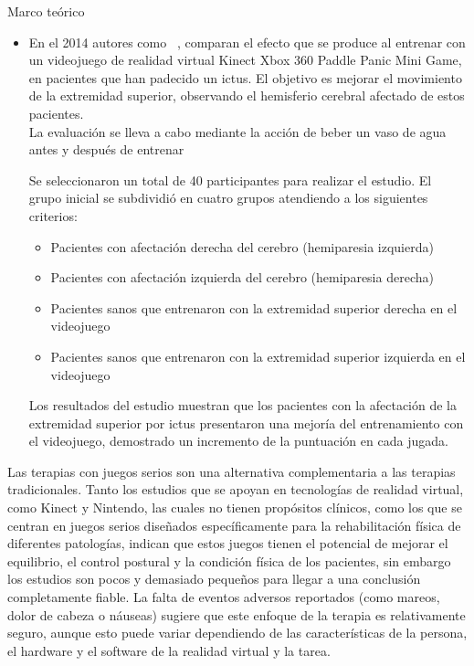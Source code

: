 \begin{thesischapter}{1} {Marco teórico}
\begin{itemize}
        \vspace{2pt}
        Un grupo de 35 pacientes se formó para la rehabilitación de las extremidades superiores
        en combinación con el soporte de brazo y el ejercicio, mientras que 33 pacientes realizaron
        la rehabilitación con los ejercicios convencionales.
        
        \item En el 2014  autores como ~\cite{10.3233/NRE-141105}, comparan el efecto
        que se produce al entrenar con un videojuego de realidad virtual Kinect Xbox 360 Paddle
        Panic Mini Game, en pacientes que han padecido un ictus. El objetivo es mejorar el
        movimiento de la extremidad superior, observando el hemisferio cerebral afectado de
        estos pacientes.\\
        La evaluación se lleva a cabo mediante la acción de beber un vaso de agua antes y después
        de entrenar

        \vspace{5pt}
        Se seleccionaron un total de 40 participantes para realizar el estudio. El grupo inicial se
        subdividió en cuatro grupos atendiendo a los siguientes criterios:
        \begin{itemize}
            \item Pacientes con afectación derecha del cerebro (hemiparesia izquierda)
            \item Pacientes con afectación izquierda del cerebro (hemiparesia derecha)
            \item Pacientes sanos que entrenaron con la extremidad superior derecha en el videojuego
            \item Pacientes sanos que entrenaron con la extremidad superior izquierda en el videojuego
        \end{itemize}
        Los resultados del estudio muestran que los pacientes con la afectación de la extremidad
        superior por ictus presentaron una mejoría del entrenamiento con el videojuego,
        demostrado un incremento de la puntuación en cada jugada.
    \end{itemize}

    \vspace{5pt}
    Las terapias con juegos serios son una alternativa complementaria a las terapias
    tradicionales. Tanto los estudios que se apoyan en tecnologías de realidad virtual, como Kinect y
    Nintendo, las cuales no tienen propósitos clínicos, como los que se centran en juegos
    serios diseñados específicamente para la rehabilitación física de diferentes patologías,
    indican que estos juegos tienen el potencial de mejorar el equilibrio, el control postural y
    la condición física de los pacientes, sin embargo los estudios son pocos y demasiado
    pequeños para llegar a una conclusión completamente fiable. La falta de eventos adversos
    reportados (como mareos, dolor de cabeza o náuseas) sugiere que este enfoque de la
    terapia es relativamente seguro, aunque esto puede variar dependiendo de las
    características de la persona, el hardware y el software de la realidad virtual y la tarea. 


\end{thesischapter}
